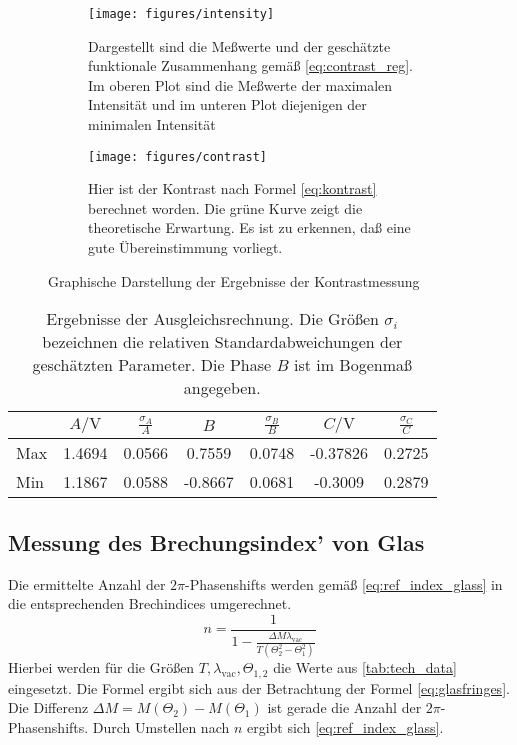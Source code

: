 \begin{figure}
  \centering
  
  \begin{subfigure}{0.8\textwidth}
    \texttt{[image: figures/intensity]}
    \caption{Dargestellt sind die Meßwerte und der geschätzte
      funktionale Zusammenhang gemäß \cref{eq:contrast_reg}.  Im oberen
      Plot sind die Meßwerte der maximalen Intensität und im unteren
      Plot diejenigen der minimalen Intensität}
    \label{fig:intensity}
  \end{subfigure}
  \vspace{5mm}

  \begin{subfigure}{0.8\textwidth}
    \texttt{[image: figures/contrast]}
    \caption{Hier ist der Kontrast nach Formel \eqref{eq:kontrast}
      berechnet worden.  Die grüne Kurve zeigt die theoretische
      Erwartung.  Es ist zu erkennen, daß eine gute Übereinstimmung
      vorliegt.}
    \label{fig:contrast}
  \end{subfigure}

  \caption{Graphische Darstellung der Ergebnisse der Kontrastmessung}
\end{figure}

\begin{table}
  \centering
  \begin{tabular}{lSSSSSS}
    \toprule
    & 
    {$A/\si{\volt}$} & {$\frac{\sigma_A}{A}$} &
    {$B$} & {$\frac{\sigma_B}{B}$} &
    {$C/\si{\volt}$} & {$\frac{\sigma_C}{C}$} \\
    \midrule
    Max &
    1.4694 & 0.0566 & 0.7559 & 0.0748 & -0.37826 & 0.2725 \\
    Min &
    1.1867 & 0.0588 & -0.8667 & 0.0681 & -0.3009 & 0.2879\\
    \bottomrule
  \end{tabular}
  \caption{Ergebnisse der Ausgleichsrechnung.  Die Größen $\sigma_i$
    bezeichnen die relativen Standardabweichungen der geschätzten 
    Parameter.  Die Phase $B$ ist im Bogenmaß angegeben.}
  \label{tab:intensity}
\end{table}

\subsection{Messung des Brechungsindex' von Glas}

Die ermittelte Anzahl der $2\pi$-Phasenshifts werden gemäß
\eqref{eq:ref_index_glass} in die entsprechenden Brechindices
umgerechnet.
%
\begin{equation}
  \label{eq:ref_index_glass}
  n = \frac{1}{1 - \frac{\Delta M \lambda_\text{vac}}{T (\Theta_2^2 - \Theta_1^2)}}
\end{equation}
%
Hierbei werden für die Größen $T, \lambda_\text{vac}, \Theta_{1, 2}$ die
Werte aus \cref{tab:tech_data} eingesetzt. Die Formel ergibt sich aus
der Betrachtung der Formel \eqref{eq:glasfringes}.  Die Differenz
$\Delta M = M(\Theta_2) - M(\Theta_1)$ ist gerade die Anzahl der
$2\pi$-Phasenshifts. Durch Umstellen nach $n$ ergibt sich
\cref{eq:ref_index_glass}.


